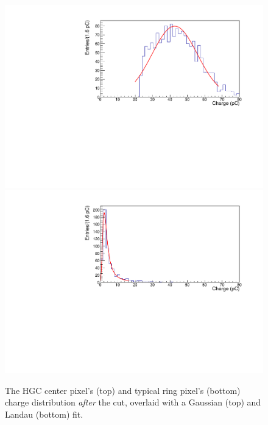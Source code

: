 \documentclass[twocolumn,aps,prd,reprint,superscriptaddress,floatfix]{revtex4-1}
\begin{document}
\begin{figure}[!htbp]
	\centering
	\includegraphics[width=\linewidth]{mpvgaus.pdf}
	\includegraphics[width=\linewidth]{mpvlandau.pdf}
	\caption{The HGC center pixel's (top) and typical ring pixel's (bottom) charge distribution \textit{after} the cut, overlaid with a Gaussian (top) and Landau (bottom) fit.}
    \label{fig:MPV}
\end{figure}
\end{document}
